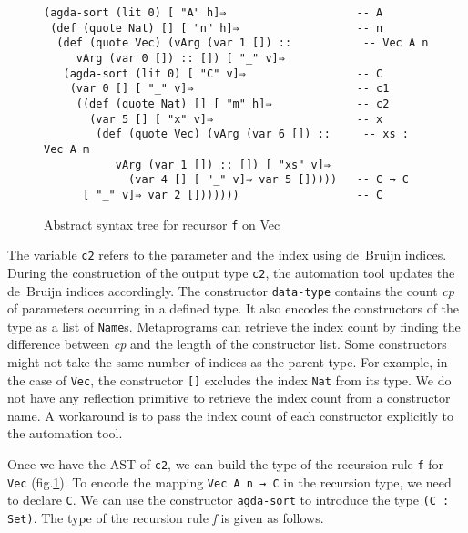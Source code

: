 \documentclass[sigplan,10pt]{acmart}
\begin{document}
\begin{figure}
\begin{center}
\begingroup
\fontsize{7pt}{9pt}\selectfont
\begin{Verbatim}[frame = single]
(agda-sort (lit 0) [ "A" h]⇒                    -- A
 (def (quote Nat) [] [ "n" h]⇒                  -- n
  (def (quote Vec) (vArg (var 1 []) ::           -- Vec A n
     vArg (var 0 []) :: []) [ "_" v]⇒
   (agda-sort (lit 0) [ "C" v]⇒                 -- C
    (var 0 [] [ "_" v]⇒                         -- c1
     ((def (quote Nat) [] [ "m" h]⇒             -- c2
       (var 5 [] [ "x" v]⇒                      -- x
        (def (quote Vec) (vArg (var 6 []) ::     -- xs : Vec A m
           vArg (var 1 []) :: []) [ "xs" v]⇒  
             (var 4 [] [ "_" v]⇒ var 5 []))))   -- C → C
      [ "_" v]⇒ var 2 []))))))                  -- C
\end{Verbatim}
\endgroup
\end{center}
\caption{Abstract syntax tree for recursor {\tt f} on Vec}
\label{fig:ast-d}
\end{figure}

\normalsize

The variable {\tt c2} refers to the parameter and the index using de~Bruijn indices. During the construction of the output type {\tt c2}, the automation tool updates the de~Bruijn indices accordingly. The constructor {\tt data-type} contains the count \emph{cp} of parameters occurring in a defined type. It also encodes the constructors of the type as a list of \texttt{Name}s. Metaprograms can retrieve the index count by finding the difference between \emph{cp} and the length of the constructor list. Some constructors might not take the same number of indices as the parent type. For example, in the case of {\tt Vec}, the constructor {\tt []} excludes the index {\tt Nat} from its type. We do not have any reflection primitive to retrieve the index count from a constructor name. A workaround is to pass the index count of each constructor explicitly to the automation tool.

Once we have the AST of {\tt c2}, we can build the type of the recursion rule {\tt f} for {\tt Vec} (fig.\ref{fig:ast-d}). To encode the mapping {\tt Vec A n → C} in the recursion type, we need to declare {\tt C}. We can use the constructor {\tt agda-sort} to introduce the type {\tt (C : Set)}. The type of the recursion rule \emph{f} is given as follows.
\end{document}
